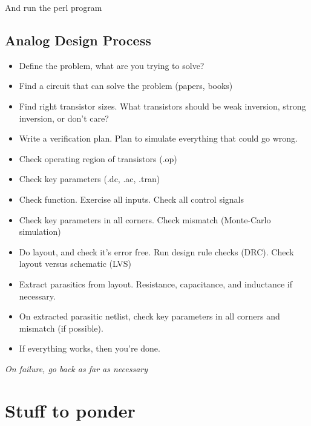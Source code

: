 And run the perl program

\begin{Shaded}
\begin{Highlighting}[]
\end{Highlighting}
\end{Shaded}

\subsection{Analog Design Process}\label{analog-design-process}

\begin{itemize}
\item
  Define the problem, what are you trying to solve?
\item
  Find a circuit that can solve the problem (papers, books)
\item
  Find right transistor sizes. What transistors should be weak
  inversion, strong inversion, or don't care?
\item
  Write a verification plan. Plan to simulate everything that could go
  wrong.
\item
  Check operating region of transistors (.op)
\item
  Check key parameters (.dc, .ac, .tran)
\item
  Check function. Exercise all inputs. Check all control signals
\item
  Check key parameters in all corners. Check mismatch (Monte-Carlo
  simulation)
\item
  Do layout, and check it's error free. Run design rule checks (DRC).
  Check layout versus schematic (LVS)
\item
  Extract parasitics from layout. Resistance, capacitance, and
  inductance if necessary.
\item
  On extracted parasitic netlist, check key parameters in all corners
  and mismatch (if possible).
\item
  If everything works, then you're done.
\end{itemize}

\emph{On failure, go back as far as necessary}

\section{Stuff to ponder}\label{stuff-to-ponder}

